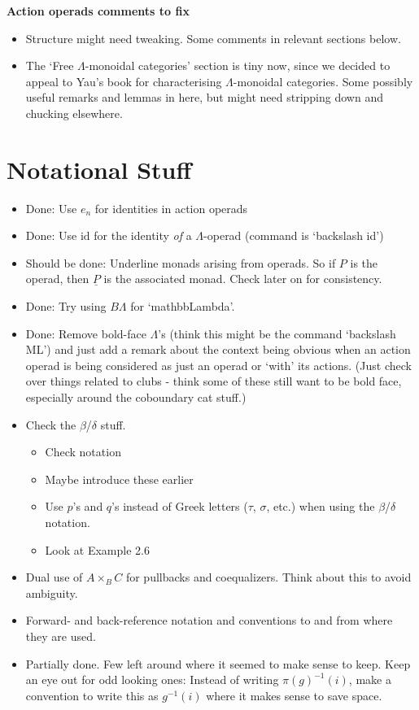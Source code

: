 \documentclass{amsart}
\begin{document}
\begin{center}
\begin{Large}
\textbf{Action operads comments to fix}
\end{Large}
\end{center}
\vskip1cm

\begin{itemize}
	\item Structure might need tweaking. Some comments in relevant sections below.
	\item The `Free $\Lambda$-monoidal categories' section is tiny now, since we decided to appeal to Yau's book for characterising $\Lambda$-monoidal categories. Some possibly useful remarks and lemmas in here, but might need stripping down and chucking elsewhere.
\end{itemize}

\section*{Notational Stuff}
\begin{itemize}
	\item Done: Use $e_n$ for identities in action operads
	\item Done: Use $\mbox{id}$ for the identity \emph{of} a $\Lambda$-operad (command is `backslash id')
	\item Should be done: Underline monads arising from operads. So if $P$ is the operad, then $\underline{P}$ is the associated monad. Check later on for consistency.
	\item Done: Try using $B\Lambda$ for `mathbb{Lambda}'.
	\item Done: Remove bold-face $\Lambda$'s (think this might be the command `backslash ML') and just add a remark about the context being obvious when an action operad is being considered as just an operad or `with' its actions. (Just check over things related to clubs - think some of these still want to be bold face, especially around the coboundary cat stuff.) 
	\item Check the $\beta$/$\delta$ stuff.
		\begin{itemize}
			\item Check notation
			\item Maybe introduce these earlier
			\item Use $p$'s and $q$'s instead of Greek letters ($\tau$, $\sigma$, etc.) when using the $\beta$/$\delta$ notation.
			\item Look at Example 2.6
		\end{itemize}
	\item Dual use of $A \times_B C$ for pullbacks and coequalizers. Think about this to avoid ambiguity.
	\item Forward- and back-reference notation and conventions to and from where they are used.
	\item Partially done. Few left around where it seemed to make sense to keep. Keep an eye out for odd looking ones: Instead of writing $\pi(g)^{-1}(i)$, make a convention to write this as $g^{-1}(i)$ where it makes sense to save space.
\end{itemize}
\end{document}
